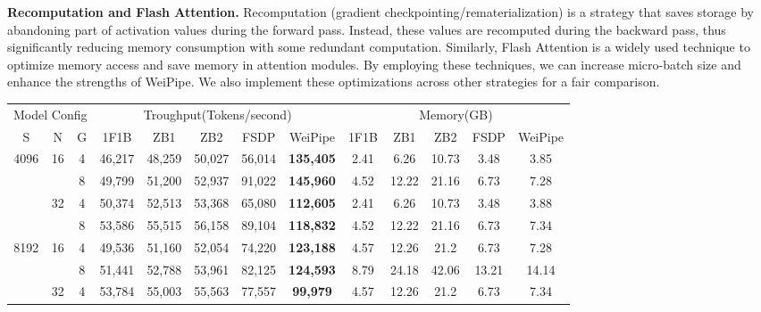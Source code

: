\documentclass[sigplan,review,anonymous]{acmart}
\begin{document}
\textbf{Recomputation and Flash Attention.} Recomputation (gradient checkpointing/rematerialization) is a strategy that saves storage by abandoning part of activation values during the forward pass. Instead, these values are recomputed during the backward pass, thus significantly reducing memory consumption with some redundant computation. Similarly, Flash Attention\cite{dao2022flashattention} is a widely used technique to optimize memory access and save memory in attention modules. By employing these techniques, we can increase micro-batch size and enhance the strengths of WeiPipe. We also implement these optimizations across other strategies for a fair comparison.


\begin{table}[!ht]
\centering
\begin{tabular}{ccc|ccccc|ccccc}
\hline
\multicolumn{3}{c|}{Model Config}                & \multicolumn{5}{c|}{Troughput(Tokens/second)}         & \multicolumn{5}{c}{Memory(GB)}          \\
S                      & N                   & G & 1F1B    & ZB1    & ZB2    & FSDP   & WeiPipe          & 1F1B  & ZB1   & ZB2   & FSDP  & WeiPipe \\ \hline
\multirow{4}{*}{4096}  & \multirow{2}{*}{16} & 4 & 46,217  & 48,259 & 50,027 & 56,014 & \textbf{135,405} & 2.41  & 6.26  & 10.73 & 3.48  & 3.85    \\
                       &                     & 8 & 49,799  & 51,200 & 52,937 & 91,022 & \textbf{145,960} & 4.52  & 12.22 & 21.16 & 6.73  & 7.28    \\
                       & \multirow{2}{*}{32} & 4 & 50,374  & 52,513 & 53,368 & 65,080 & \textbf{112,605} & 2.41  & 6.26  & 10.73 & 3.48  & 3.88    \\
                       &                     & 8 & 53,586  & 55,515 & 56,158 & 89,104 & \textbf{118,832} & 4.52  & 12.22 & 21.16 & 6.73  & 7.34    \\ \hline
\multirow{4}{*}{8192}  & \multirow{2}{*}{16} & 4 & 49,536  & 51,160 & 52,054 & 74,220 & \textbf{123,188} & 4.57  & 12.26 & 21.2  & 6.73  & 7.28    \\
                       &                     & 8 & 51,441  & 52,788 & 53,961 & 82,125 & \textbf{124,593} & 8.79  & 24.18 & 42.06 & 13.21 & 14.14   \\
                       & \multirow{2}{*}{32} & 4 & 53,784  & 55,003 & 55,563 & 77,557 & \textbf{99,979}  & 4.57  & 12.26 & 21.2  & 6.73  & 7.34    \\

\end{tabular}
\end{table}
\end{document}
